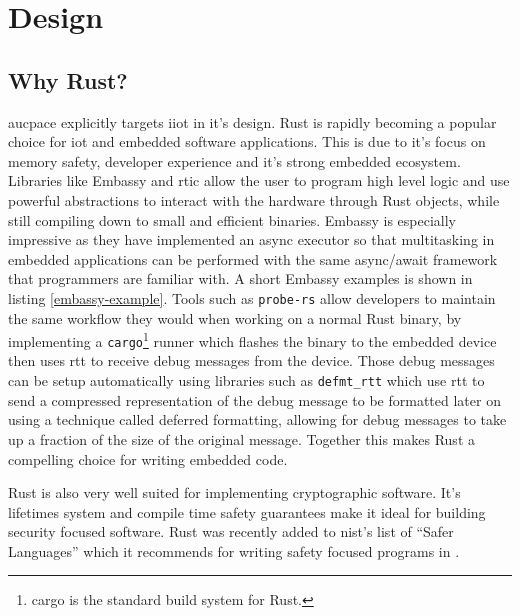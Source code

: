 \chapter{Design}
\label{chap:design}

\section{Why Rust?}
\label{sec:why-rust}

\gls{aucpace} explicitly targets \gls{iiot} in it's design.
Rust is rapidly becoming a popular choice for \gls{iot} and embedded software applications.
This is due to it's focus on memory safety, developer experience and it's strong embedded ecosystem.
Libraries like Embassy and \gls{rtic} allow the user to program high level logic and use powerful abstractions to interact with the hardware through Rust objects, while still compiling down to small and efficient binaries.
Embassy is especially impressive as they have implemented an async executor so that multitasking in embedded applications can be performed with the same async/await framework that programmers are familiar with.
A short Embassy examples is shown in listing \ref{embassy-example}.
Tools such as \texttt{probe-rs} allow developers to maintain the same workflow they would when working on a normal Rust binary, by implementing a \texttt{cargo}\footnote{cargo is the standard build system for Rust.} runner which flashes the binary to the embedded device then uses \gls{rtt} to receive debug messages from the device.
Those debug messages can be setup automatically using libraries such as \texttt{defmt\_rtt} which use \gls{rtt} to send a compressed representation of the debug message to be formatted later on using a technique called deferred formatting, allowing for debug messages to take up a fraction of the size of the original message.
Together this makes Rust a compelling choice for writing embedded code.

\medskip{}


Rust is also very well suited for implementing cryptographic software.
It's lifetimes system and compile time safety guarantees make it ideal for building security focused software.
Rust was recently added to \gls{nist}'s list of \enquote{Safer Languages} which it recommends for writing safety focused programs in \cite{nist-safer-languages}.

